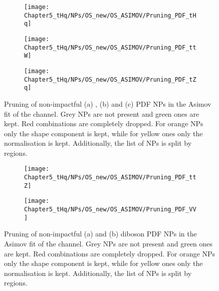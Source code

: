 \begin{figure}[h]
  \centering
  \begin{subfigure}{0.3\textwidth}
  \texttt{[image: Chapter5\_tHq/NPs/OS\_new/OS\_ASIMOV/Pruning\_PDF\_tHq]}
	\caption{}
  \end{subfigure}
  \begin{subfigure}{0.3\textwidth}
    \texttt{[image: Chapter5\_tHq/NPs/OS\_new/OS\_ASIMOV/Pruning\_PDF\_ttW]}
  	\caption{}
  \end{subfigure}
  \begin{subfigure}{0.3\textwidth}
  \texttt{[image: Chapter5\_tHq/NPs/OS\_new/OS\_ASIMOV/Pruning\_PDF\_tZq]}
  \caption{}
  \end{subfigure}
   \caption{Pruning of non-impactful (a) \tHq, (b) \ttW and (c) \tZq PDF NPs in the Asimov fit of the \dilepOStau channel. Grey NPs are 
   not present and green ones are kept. Red combinations are completely dropped. For orange NPs only the shape 
   component is kept, while for yellow ones only the normalisation is kept. Additionally, the list of NPs is split by regions.}
  \label{fig:Appendix:AdditionalResults:OS:Asimov:Pruning:tHqPDF}
\end{figure}


\begin{figure}[h]
  \centering
  \begin{subfigure}{0.42\textwidth}
  \texttt{[image: Chapter5\_tHq/NPs/OS\_new/OS\_ASIMOV/Pruning\_PDF\_ttZ]} 
  \caption{}
  \end{subfigure}
  \begin{subfigure}{0.42\textwidth}
  \texttt{[image: Chapter5\_tHq/NPs/OS\_new/OS\_ASIMOV/Pruning\_PDF\_VV]}
  \caption{}
  \end{subfigure}
   \caption{Pruning of non-impactful (a) \ttZ and (b) diboson PDF NPs in the Asimov fit of the \dilepOStau channel. Grey NPs are 
   not present and green ones are kept. Red combinations are completely dropped. For orange NPs only the shape 
   component is kept, while for yellow ones only the normalisation is kept. Additionally, the list of NPs is split by regions.}
  \label{fig:Appendix:AdditionalResults:OS:Asimov:Pruning:ttZPDF}
\end{figure}




\FloatBarrier

